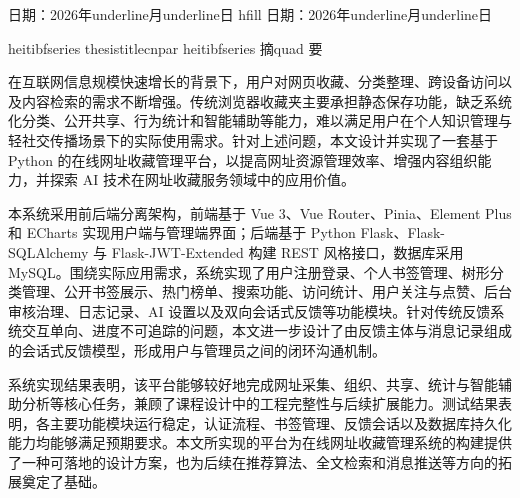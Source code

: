 \documentclass[12pt,a4paper]{ctexart}
\begin{document}
\vspace{1cm}

\noindent 日期：2026年underline{\hspace{0.8cm}}月underline{\hspace{0.8cm}}日 hfill 日期：2026年underline{\hspace{0.8cm}}月underline{\hspace{0.8cm}}日

\clearpage
{}
\setcounter{page}{1}
\pagestyle{fancy}
\fancyhf{}
\cfoot{\thepage}
\begin{center}
    {heitibfseries thesistitlecnpar}
    \vspace{0.6cm}
    {heitibfseries 摘quad 要}
\end{center}

{\songti
在互联网信息规模快速增长的背景下，用户对网页收藏、分类整理、跨设备访问以及内容检索的需求不断增强。传统浏览器收藏夹主要承担静态保存功能，缺乏系统化分类、公开共享、行为统计和智能辅助等能力，难以满足用户在个人知识管理与轻社交传播场景下的实际使用需求。针对上述问题，本文设计并实现了一套基于 Python 的在线网址收藏管理平台，以提高网址资源管理效率、增强内容组织能力，并探索 AI 技术在网址收藏服务领域中的应用价值。

本系统采用前后端分离架构，前端基于 Vue 3、Vue Router、Pinia、Element Plus 和 ECharts 实现用户端与管理端界面；后端基于 Python Flask、Flask-SQLAlchemy 与 Flask-JWT-Extended 构建 REST 风格接口，数据库采用 MySQL。围绕实际应用需求，系统实现了用户注册登录、个人书签管理、树形分类管理、公开书签展示、热门榜单、搜索功能、访问统计、用户关注与点赞、后台审核治理、日志记录、AI 设置以及双向会话式反馈等功能模块。针对传统反馈系统交互单向、进度不可追踪的问题，本文进一步设计了由反馈主体与消息记录组成的会话式反馈模型，形成用户与管理员之间的闭环沟通机制。

系统实现结果表明，该平台能够较好地完成网址采集、组织、共享、统计与智能辅助分析等核心任务，兼顾了课程设计中的工程完整性与后续扩展能力。测试结果表明，各主要功能模块运行稳定，认证流程、书签管理、反馈会话以及数据库持久化能力均能够满足预期要求。本文所实现的平台为在线网址收藏管理系统的构建提供了一种可落地的设计方案，也为后续在推荐算法、全文检索和消息推送等方向的拓展奠定了基础。

\vspace{0.8cm}
}
\end{document}
